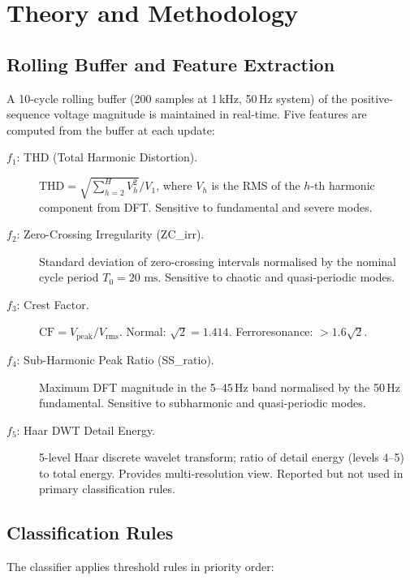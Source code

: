 \documentclass[11pt, a4paper]{article}
\newcommand{\ms}{\,\text{ms}}
\begin{document}
\section{Theory and Methodology}
\label{sec:theory}

\subsection{Rolling Buffer and Feature Extraction}

A 10-cycle rolling buffer (200 samples at 1\,kHz, 50\,Hz system)
of the positive-sequence voltage magnitude is maintained in real-time.
Five features are computed from the buffer at each update:

\begin{description}
  \item[$f_1$: THD (Total Harmonic Distortion).]
    $\mathrm{THD} = \sqrt{\sum_{h=2}^{H} V_h^2} / V_1$,
    where $V_h$ is the RMS of the $h$-th harmonic component from DFT.
    Sensitive to fundamental and severe modes.

  \item[$f_2$: Zero-Crossing Irregularity (ZC\_irr).]
    Standard deviation of zero-crossing intervals normalised by the
    nominal cycle period $T_0 = 20\,\ms$.
    Sensitive to chaotic and quasi-periodic modes.

  \item[$f_3$: Crest Factor.]
    $\mathrm{CF} = V_{\mathrm{peak}} / V_{\mathrm{rms}}$.
    Normal: $\sqrt{2} = 1.414$. Ferroresonance: $> 1.6\sqrt{2}$.

  \item[$f_4$: Sub-Harmonic Peak Ratio (SS\_ratio).]
    Maximum DFT magnitude in the 5--45\,Hz band normalised by the
    50\,Hz fundamental. Sensitive to subharmonic and quasi-periodic modes.

  \item[$f_5$: Haar DWT Detail Energy.]
    5-level Haar discrete wavelet transform; ratio of detail energy
    (levels 4--5) to total energy. Provides multi-resolution view.
    Reported but not used in primary classification rules.
\end{description}

\subsection{Classification Rules}

The classifier applies threshold rules in priority order:
\end{document}
